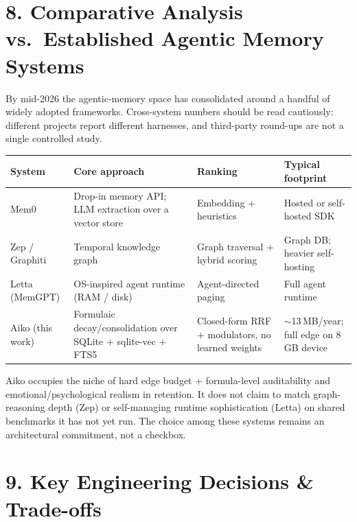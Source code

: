 \documentclass[]{article}
\begin{document}
\hypertarget{comparative-analysis-vs.-established-agentic-memory-systems}{%
\section{\texorpdfstring{\textbf{8. Comparative Analysis vs.\ Established
Agentic Memory
Systems}}{8. Comparative Analysis vs.\ Established Agentic Memory Systems}}\label{comparative-analysis-vs.-established-agentic-memory-systems}}

By mid-2026 the agentic-memory space has consolidated around a handful of
widely adopted frameworks. Cross-system numbers should be read cautiously:
different projects report different harnesses, and third-party round-ups
are not a single controlled study.

\begin{longtable}[]{@{}
  >{\raggedright\arraybackslash}p{}
  >{\raggedright\arraybackslash}p{}
  >{\raggedright\arraybackslash}p{}
  >{\raggedright\arraybackslash}p{}@{}}
\toprule\noalign{}
\textbf{System} & \textbf{Core approach} & \textbf{Ranking} & \textbf{Typical footprint} \\
\midrule\noalign{}
\endhead
\bottomrule\noalign{}
\endlastfoot
Mem0 & Drop-in memory API; LLM extraction over a vector store & Embedding + heuristics & Hosted or self-hosted SDK \\
Zep / Graphiti & Temporal knowledge graph & Graph traversal + hybrid scoring & Graph DB; heavier self-hosting \\
Letta (MemGPT) & OS-inspired agent runtime (RAM / disk) & Agent-directed paging & Full agent runtime \\
Aiko (this work) & Formulaic decay/consolidation over SQLite + sqlite-vec + FTS5 & Closed-form RRF + modulators, no learned weights & \(\sim\)13\,MB/year; full edge on 8\,GB device \\
\end{longtable}

Aiko occupies the niche of hard edge budget + formula-level auditability
and emotional/psychological realism in retention. It does not claim to
match graph-reasoning depth (Zep) or self-managing runtime sophistication
(Letta) on shared benchmarks it has not yet run. The choice among these
systems remains an architectural commitment, not a checkbox.

\hypertarget{key-engineering-decisions-trade-offs}{%
\section{\texorpdfstring{\textbf{9. Key Engineering Decisions \&
Trade-offs}}{9. Key Engineering Decisions \& Trade-offs}}\label{key-engineering-decisions-trade-offs}}
\end{document}
